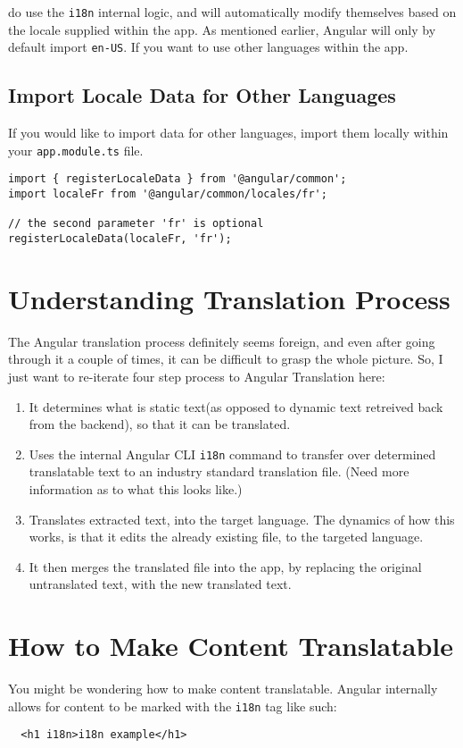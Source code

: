 do use the \lstinline{i18n} internal logic, and will automatically modify 
themselves based on the locale supplied within the app. As mentioned earlier,
Angular will only by default import \lstinline{en-US}. If you want to use other
languages within the app. 

\subsection{Import Locale Data for Other Languages}
If you would like to import data for other languages, import them locally 
within your \lstinline{app.module.ts} file. 

\begin{lstlisting}[caption=app.module.ts]
import { registerLocaleData } from '@angular/common';
import localeFr from '@angular/common/locales/fr';

// the second parameter 'fr' is optional
registerLocaleData(localeFr, 'fr');
\end{lstlisting}

\section{ Understanding Translation Process }
The Angular translation process definitely seems foreign, and even after going 
through it a couple of times, it can be difficult to grasp the whole picture. 
So, I just want to re-iterate four step process to Angular Translation here: 
\begin{enumerate}
  \item It determines what is static text(as opposed to dynamic text retreived back
  from the backend), so that it can be translated.
  \item Uses the internal Angular CLI \lstinline{i18n} command to transfer over 
  determined translatable text to an industry standard translation file. (Need 
  more information as to what this looks like.)
  \item Translates extracted text, into the target language. The dynamics of
  how this works, is that it edits the already existing file, to the targeted 
  language. 
  \item It then merges the translated file into the app, by replacing the 
  original untranslated text, with the new translated text. 
\end{enumerate}

\section{How to Make Content Translatable}
You might be wondering how to make content translatable. Angular internally 
allows for content to be marked with the \lstinline{i18n} tag like such: 
\begin{lstlisting}
  <h1 i18n>i18n example</h1>
\end{lstlisting}

